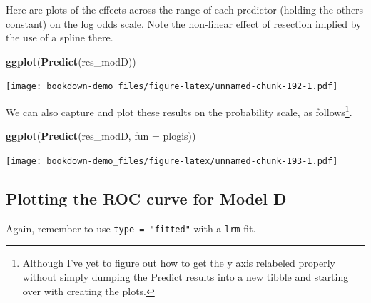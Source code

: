 \documentclass[]{book}
\newenvironment{Shaded}{\begin{snugshade}}{\end{snugshade}}
\newcommand{\KeywordTok}[1]{\textcolor[rgb]{0.13,0.29,0.53}{\textbf{#1}}}
\newcommand{\DataTypeTok}[1]{\textcolor[rgb]{0.13,0.29,0.53}{#1}}
\newcommand{\NormalTok}[1]{#1}
\let\rmarkdownfootnote\footnote%
\def\footnote{\protect\rmarkdownfootnote}
\theoremstyle{definition}
\theoremstyle{definition}
\theoremstyle{definition}
\theoremstyle{remark}
\begin{document}
Here are plots of the effects across the range of each predictor
(holding the others constant) on the log odds scale. Note the non-linear
effect of resection implied by the use of a spline there.

\begin{Shaded}
\begin{Highlighting}[]
\KeywordTok{ggplot}\NormalTok{(}\KeywordTok{Predict}\NormalTok{(res_modD))}
\end{Highlighting}
\end{Shaded}

\texttt{[image: bookdown-demo\_files/figure-latex/unnamed-chunk-192-1.pdf]}

We can also capture and plot these results on the probability scale, as
follows\footnote{Although I've yet to figure out how to get the y axis
  relabeled properly without simply dumping the Predict results into a
  new tibble and starting over with creating the plots.}.

\begin{Shaded}
\begin{Highlighting}[]
\KeywordTok{ggplot}\NormalTok{(}\KeywordTok{Predict}\NormalTok{(res_modD, }\DataTypeTok{fun =}\NormalTok{ plogis))}
\end{Highlighting}
\end{Shaded}

\texttt{[image: bookdown-demo\_files/figure-latex/unnamed-chunk-193-1.pdf]}

\subsection{Plotting the ROC curve for Model
D}\label{plotting-the-roc-curve-for-model-d}

Again, remember to use \texttt{type\ =\ "fitted"} with a \texttt{lrm}
fit.
\end{document}
